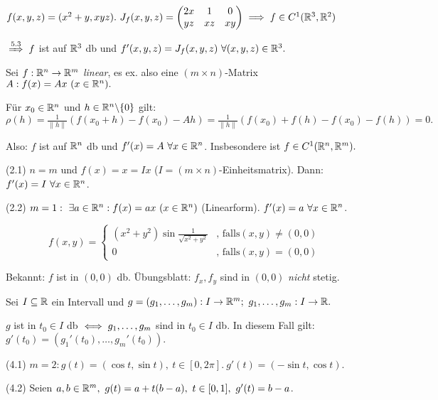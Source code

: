 \documentclass[a4paper,twoside,DIV15,BCOR12mm,chapterprefix=true,headings=twolinechapter]{scrbook}
\begin{document}
\begin{beispiele}
\item $f(x,y,z) = (x^2+y, xyz).\ J_f(x,y,z) = \begin{pmatrix}
2x & 1 & 0\\
yz & xz & xy\end{pmatrix} \implies f \in C^1(\mathbb{R}^3,\mathbb{R}^2)$

$\folgtnach{5.3} f$ ist auf $\mathbb{R}^3$ db und $f'(x,y,z) = J_f(x,y,z)\ \forall (x,y,z) \in \mathbb{R}^3.$

\item Sei $f:\mathbb{R}^n \to \mathbb{R}^m$ \emph{linear}, es ex. also eine $(m \times n)$-Matrix $A:f(x) = Ax\ (x \in \mathbb{R}^n).$

Für $x_0 \in \mathbb{R}^n$ und $h \in \mathbb{R}^n \backslash\{0\}$ gilt:\\
$\rho(h) = \frac{1}{\|h\|}(f(x_0+h) - f(x_0) - Ah) = \frac{1}{\|h\|}(f(x_0) + f(h) - f(x_0) - f(h)) = 0.$

Also: $f$ ist auf $\mathbb{R}^n$ db und $f'(x) = A\ \forall x \in \mathbb{R}^n$. Insbesondere ist $f \in C^1(\mathbb{R}^n,\mathbb{R}^m).$

\item[(2.1)] $n = m$ und $f(x) = x = Ix$ ($I = (m \times n)$-Einheitsmatrix). Dann: $f'(x) = I\ \forall x \in \mathbb{R}^n$.

\item[(2.2)] $m = 1:\ \exists a \in \mathbb{R}^n: f(x) = ax\ (x \in \mathbb{R}^n)$ (Linearform). $f'(x) = a\ \forall x \in \mathbb{R}^n$.

\item $$f(x,y) = \begin{cases}
(x^2+y^2) \sin \frac{1}{\sqrt{x^2+y^2}} & \text{, falls} (x,y) \ne (0,0)\\
0 & \text{, falls} (x,y) = (0,0)\end{cases}$$

Bekannt: $f$ ist in $(0,0)$ db. \"Ubungsblatt: $f_x,f_y$ sind in $(0,0)$ \emph{nicht} stetig.

\item Sei $I \subseteq \mathbb{R}$ ein Intervall und $g = (g_1,\ldots,g_m): I \to \MdR^m;\ g_1,\ldots,g_m: I \to \MdR.$

$g$ ist in $t_0 \in I$ db $\iff g_1,\ldots,g_m$ sind in $t_0 \in I$ db. In diesem Fall gilt: $g'(t_0) = (g_1'(t_0),\ldots,g_m'(t_0)).$

\item[(4.1)] $m = 2: g(t) = (\cos t,\sin t),\ t \in [0,2\pi].\ g'(t) = (-\sin t,\cos t).$
\item[(4.2)] Seien $a,b \in \MdR^m,\ g(t) = a+t(b-a),\ t \in [0,1],\ g'(t) = b-a$.
\end{beispiele}
\end{document}
